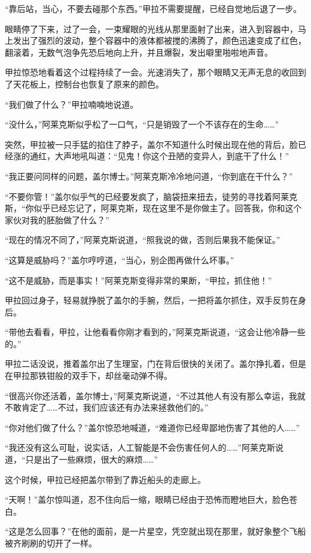 “靠后站，当心，不要去碰那个东西。”甲拉不需要提醒，已经自觉地后退了一步。 

眼睛停了下来，过了一会，一束耀眼的光线从那里面射了出来，进入到容器中，马上发出了强烈的波动，整个容器中的液体都被搅的沸腾了，颜色迅速变成了红色，翻滚着，无数气泡争先恐后地向上升，并且爆裂，发出噼里啪啦地声音。 

甲拉惊恐地看着这个过程持续了一会。光速消失了，那个眼睛又无声无息的收回到了天花板上，控制台也恢复了原来的颜色。 

“我们做了什么？”甲拉喃喃地说道。 

“没什么，”阿莱克斯似乎松了一口气，“只是销毁了一个不该存在的生命……” 

突然，甲拉被一只手猛的掐住了脖子，盖尔不知道什么时候出现在他的背后，脸已经涨的通红，大声地吼叫道：“见鬼！你这个丑陋的变异人，到底干了什么！” 

“我正要问同样的问题，盖尔博士。”阿莱克斯冷冷地问道，“你到底在干什么？” 

“不要你管！”盖尔似乎气的已经要发疯了，脑袋扭来扭去，徒劳的寻找着阿莱克斯，“你似乎已经忘记了，阿莱克斯，现在这里不是你做主了。回答我，你和这个家伙对我的胚胎做了什么？” 

“现在的情况不同了，”阿莱克斯说道，“照我说的做，否则后果我不能保证。” 

“这算是威胁吗？”盖尔哼哼道，“当心，别企图再做什么坏事。” 

“这不是威胁，而是事实！”阿莱克斯变得非常的果断，“甲拉，抓住他！” 

甲拉回过身子，轻易就挣脱了盖尔的手腕，然后，一把将盖尔抓住，双手反剪在身后。 

“带他去看看，甲拉，让他看看你刚才看到的，”阿莱克斯说道，“这会让他冷静一些的。” 

甲拉二话没说，推着盖尔出了生理室，门在背后很快的关闭了。盖尔挣扎着，但是在甲拉那铁钳般的双手下，却丝毫动弹不得。 

“很高兴你还活着，盖尔博士，”阿莱克斯说道，“不过其他人有没有那么幸运，我就不敢肯定了……不过，我们应该还有办法来拯救他们的。” 

“你对他们做了什么？”盖尔惊恐地喊道，“难道你已经卑鄙地伤害了其他的人……” 

“我还没有这么可耻，说实话，人工智能是不会伤害任何人的……”阿莱克斯说道，“只是出了一些麻烦，很大的麻烦……” 

这个时候，甲拉已经把盖尔带到了靠近船头的走廊上。 

“天啊！”盖尔惊叫道，忍不住向后一缩，眼睛已经由于恐怖而瞪地巨大，脸色苍白。 

“这是怎么回事？”在他的面前，是一片星空，凭空就出现在那里，就好象整个飞船被齐刷刷的切开了一样。 

